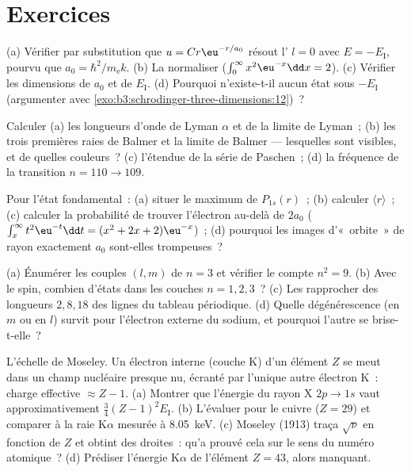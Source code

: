 \section{Exercices}

\begin{exercise}[$\star$]\label{exo:b3:hydrogen-atom:1}
(a) Vérifier par substitution que $u = Cr\eu^{-r/a_0}$ résout
l' $l = 0$ avec $E = -E_{\text{I}}$, pourvu que $a_0 =
\hbar^2/m_{\text{e}}k$. (b) La normaliser ($\int_0^\infty
x^2\eu^{-x}\dd x = 2$). (c) Vérifier les dimensions de $a_0$ et de
$E_{\text{I}}$. (d) Pourquoi n'existe-t-il aucun état sous
$-E_{\text{I}}$ (argumenter avec
\cref{exo:b3:schrodinger-three-dimensions:12})~?
\end{exercise}

\begin{exercise}[$\star$]\label{exo:b3:hydrogen-atom:2}
Calculer (a) les longueurs d'onde de Lyman $\alpha$ et de la limite de
Lyman~; (b) les trois premières raies de Balmer et la limite de Balmer
--- lesquelles sont visibles, et de quelles couleurs~? (c) l'étendue
de la série de Paschen~; (d) la fréquence de la transition
$n = 110 \to 109$.
\end{exercise}

\begin{exercise}[$\star$]\label{exo:b3:hydrogen-atom:3}
Pour l'état fondamental~: (a) situer le maximum de $P_{1s}(r)$~; (b)
calculer $\langle r\rangle$~; (c) calculer la probabilité de trouver
l'électron au-delà de $2a_0$ ($\int_x^\infty t^2\eu^{-t}\dd t = (x^2 +
2x + 2)\eu^{-x}$)~; (d) pourquoi les images d'«~orbite~» de rayon
exactement $a_0$ sont-elles trompeuses~?
\end{exercise}

\begin{exercise}[$\star$]\label{exo:b3:hydrogen-atom:4}
(a) Énumérer les couples $(l, m)$ de $n = 3$ et vérifier le compte $n^2 =
9$. (b) Avec le spin, combien d'états dans les couches $n = 1, 2, 3$~?
(c) Les rapprocher des longueurs $2, 8, 18$ des lignes du tableau
périodique. (d) Quelle dégénérescence (en $m$ ou en $l$) survit pour
l'électron externe du sodium, et pourquoi l'autre se brise-t-elle~?
\end{exercise}

\begin{exercise}[$\star\star$]\label{exo:b3:hydrogen-atom:5}
L'échelle de Moseley. Un électron interne (couche K) d'un élément $Z$
se meut dans un champ nucléaire presque nu, écranté par l'unique autre
électron K~: charge effective $\approx Z - 1$. (a) Montrer que
l'énergie du rayon X $2p \to 1s$ vaut approximativement
$\tfrac34(Z-1)^2E_{\text{I}}$. (b) L'évaluer pour le cuivre
($Z = 29$) et comparer à la raie K$\alpha$ mesurée à \qty{8.05}{keV}.
(c) Moseley (1913) traça $\sqrt{\nu}$ en fonction de $Z$ et obtint des
droites~: qu'a prouvé cela sur le sens du numéro atomique~? (d)
Prédiser l'énergie K$\alpha$ de l'élément $Z = 43$, alors manquant.
\end{exercise}

